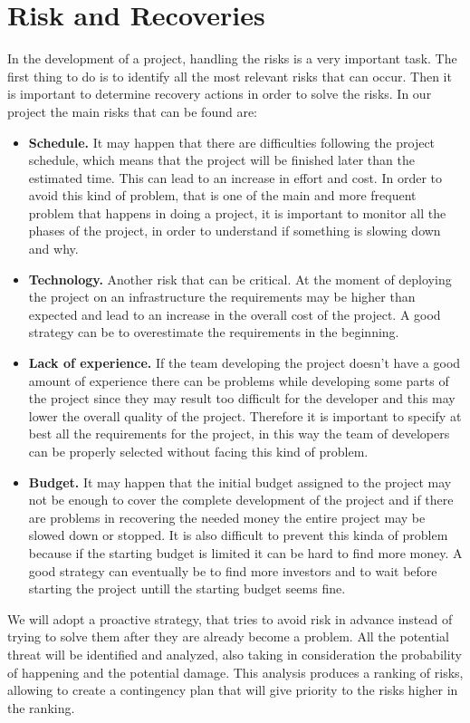 \section{Risk and Recoveries}
In the development of a project, handling the risks is a very important task. The first thing to do is to identify all
the most relevant risks that can occur. Then it is important to determine recovery actions in order to solve the risks.
In our project the main risks that can be found are:
\begin{itemize}
  \item \textbf{Schedule.} It may happen that there are difficulties following the project schedule, which means that the project will be finished later
  than the estimated time. This can lead to an increase in effort and cost.
  In order to avoid this kind of problem, that is one of the main and more frequent problem that happens in doing a project, it is important to monitor all the phases of the project,
  in order to understand if something is slowing down and why.
  \item \textbf{Technology.} Another risk that can be critical. At the moment of deploying the project on an infrastructure the requirements may be higher than expected
  and lead to an increase in the overall cost of the project.
  A good strategy can be to overestimate the requirements in the beginning.
  \item \textbf{Lack of experience.} If the team developing the project doesn't have a good amount of experience there can be problems while developing some parts of the project since
  they may result too difficult for the developer and this may lower the overall quality of the project.
  Therefore it is important to specify at best all the requirements for the project, in this way the team of developers can be properly selected without facing this kind of problem.
  \item \textbf{Budget.} It may happen that the initial budget assigned to the project may not be enough to cover the complete development of the project and if there are problems in recovering
  the needed money the entire project may be slowed down or stopped.
  It is also difficult to prevent this kinda of problem because if the starting budget is limited it can be hard to find more money. A good strategy can eventually be to find more investors and to
  wait before starting the project untill the starting budget seems fine.
\end{itemize}

We will adopt a proactive strategy, that tries to avoid risk in advance instead of trying to solve them after they are already become a problem. All the potential threat will be
identified and analyzed, also taking in consideration the probability of happening and the potential damage. This analysis produces a ranking of risks, allowing to create a contingency plan
that will give priority to the risks higher in the ranking. 
